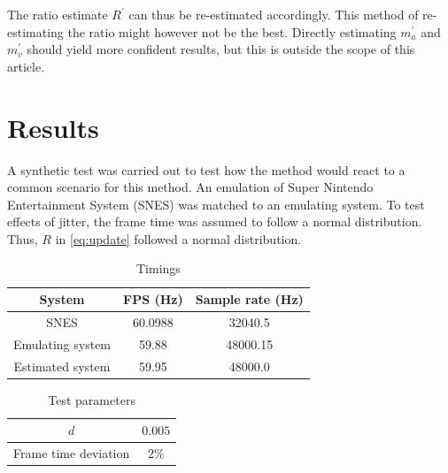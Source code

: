 \documentclass[11pt, a4paper]{article}
\begin{document}
The ratio estimate $R^{'}$ can thus be re-estimated accordingly. This method of re-estimating the ratio might however not be the best. Directly estimating $m_a^{'}$ and $m_v^{'}$ should yield more confident results, but this is outside the scope of this article.

\section{Results}

A synthetic test was carried out to test how the method would react to a common scenario for this method. An emulation of Super Nintendo Entertainment System (SNES) was matched to an emulating system.
To test effects of jitter, the frame time was assumed to follow a normal distribution.
Thus, $R$ in \eqref{eq:update} followed a normal distribution.

\begin{table}[H]
\centering
\caption{Timings}
\begin{tabular}{|c|c|c|}
	\hline
	System & FPS (Hz) & Sample rate (Hz)\\\hline
	SNES & 60.0988 & 32040.5\\\hline
	Emulating system & 59.88 & 48000.15\\\hline
	Estimated system & 59.95 & 48000.0\\\hline
\end{tabular}
\end{table}

\begin{table}[H]
\centering
\caption{Test parameters}
\begin{tabular}{|c|c|}
	\hline
	$d$ & $0.005$\\\hline
	Frame time deviation & $2 \%$\\\hline
\end{tabular}
\end{table}
\end{document}
